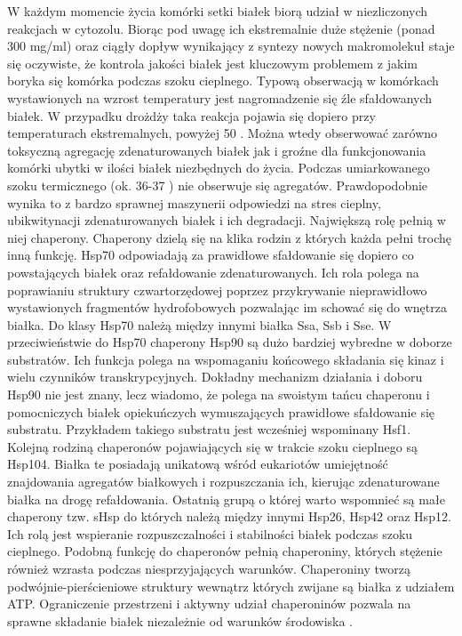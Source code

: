 \documentclass{pracamgr}
\begin{document}
 
 W każdym  momencie życia komórki setki białek biorą udział w niezliczonych reakcjach w cytozolu. Biorąc pod uwagę ich ekstremalnie
 duże stężenie (ponad 300 mg/ml) oraz ciągły dopływ wynikający z syntezy nowych makromolekuł staje się oczywiste, że 
 kontrola jakości białek jest kluczowym problemem z jakim boryka się komórka podczas szoku cieplnego.
 Typową obserwacją w komórkach wystawionych na wzrost temperatury jest nagromadzenie się źle sfałdowanych białek. 
 W przypadku drożdży taka reakcja pojawia się dopiero przy temperaturach ekstremalnych, powyżej 50 \textcelsius. Można
 wtedy obserwować zarówno toksyczną agregację zdenaturowanych białek jak i groźne dla funkcjonowania komórki ubytki w 
 ilości białek niezbędnych do życia. Podczas umiarkowanego szoku termicznego (ok. 36-37 \textcelsius) nie obserwuje się
 agregatów. Prawdopodobnie wynika to z bardzo sprawnej maszynerii odpowiedzi na stres cieplny, ubikwitynacji zdenaturowanych
 białek i ich degradacji. Największą rolę pełnią w niej chaperony. Chaperony dzielą się na klika 
 rodzin z których każda pełni trochę inną funkcję. Hsp70 odpowiadają za prawidłowe sfałdowanie się dopiero co powstających białek oraz
 refałdowanie zdenaturowanych. Ich rola polega na poprawianiu struktury czwartorzędowej poprzez przykrywanie nieprawidłowo wystawionych fragmentów 
 hydrofobowych pozwalając im schować się do wnętrza białka. Do klasy Hsp70 należą między innymi białka Ssa, Ssb i Sse. W przeciwieństwie do
 Hsp70 chaperony Hsp90 są dużo bardziej wybredne w doborze substratów. Ich funkcja polega na wspomaganiu końcowego składania się kinaz i wielu czynników transkrypcyjnych. 
 Dokładny mechanizm działania i doboru Hsp90 nie jest znany, lecz wiadomo, że polega na swoistym tańcu chaperonu i pomocniczych białek opiekuńczych 
 wymuszających prawidłowe sfałdowanie się substratu. Przykładem takiego substratu jest wcześniej wspominany Hsf1. Kolejną rodziną 
 chaperonów pojawiających się w trakcie szoku cieplnego są Hsp104. Białka te posiadają unikatową wśród eukariotów umiejętność znajdowania
 agregatów białkowych i rozpuszczania ich, kierując zdenaturowane białka na drogę refałdowania. Ostatnią grupą o której warto wspomnieć
 są małe chaperony tzw. sHsp do których należą między innymi Hsp26, Hsp42 oraz Hsp12. Ich rolą jest wspieranie rozpuszczalności i stabilności białek
 podczas szoku cieplnego. Podobną funkcję do chaperonów pełnią chaperoniny, których stężenie również wzrasta podczas niesprzyjających warunków.
 Chaperoniny tworzą podwójnie-pierścieniowe struktury wewnątrz których zwijane są białka z udziałem ATP. Ograniczenie przestrzeni i aktywny udział chaperoninów
 pozwala na sprawne składanie białek niezależnie od warunków środowiska \cite{Bible}.
\end{document}
